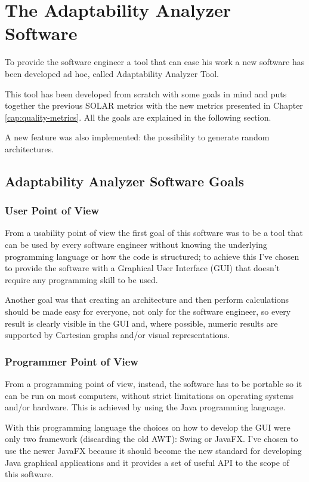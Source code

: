 \chapter{The Adaptability Analyzer Software}
\label{cap:design}

To provide the software engineer a tool that can ease his work a new software has been developed ad hoc, called Adaptability Analyzer Tool.

This tool has been developed from scratch with some goals in mind and puts together the previous SOLAR\cite{solar} metrics with the new metrics presented in Chapter \ref{cap:quality-metrics}. All the goals are explained in the following section.

A new feature was also implemented: the possibility to generate random architectures.

\section{Adaptability Analyzer Software Goals}
\subsection{User Point of View}
From a usability point of view the first goal of this software was to be a tool that can be used by every software engineer without knowing the underlying programming language or how the code is structured; to achieve this I've chosen to provide the software with a Graphical User Interface (GUI) that doesn't require any programming skill to be used.

Another goal was that creating an architecture and then perform calculations should be made easy for everyone, not only for the software engineer, so every result is clearly visible in the GUI and, where possible, numeric results are supported by Cartesian graphs and/or visual representations.

\subsection{Programmer Point of View}
From a programming point of view, instead, the software has to be portable so it can be run on most computers, without strict limitations on operating systems and/or hardware. This is achieved by using the Java programming language\cite{java-se}. 

With this programming language the choices on how to develop the GUI were only two framework (discarding the old AWT\cite{awt}): Swing\cite{swing} or JavaFX\cite{javafx}. I've chosen to use the newer JavaFX because it should become the new standard for developing Java graphical applications and it provides a set of useful API to the scope of this software.

